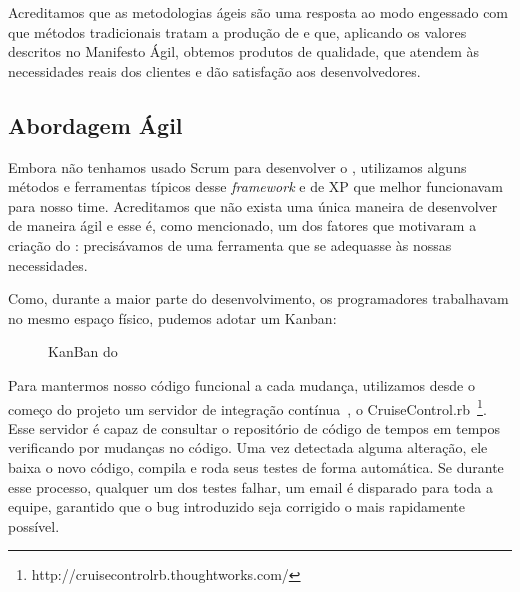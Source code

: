 Acreditamos que as metodologias ágeis são uma resposta ao modo engessado com que métodos tradicionais tratam a produção de \software e que, aplicando os valores descritos no Manifesto Ágil, obtemos produtos de qualidade, que atendem às necessidades reais dos clientes e dão satisfação aos desenvolvedores.  

\subsection{Abordagem Ágil}

Embora não tenhamos usado Scrum para desenvolver o \calopsita, utilizamos alguns métodos e ferramentas típicos desse \textit{framework} e de XP que melhor funcionavam para nosso time. Acreditamos que não exista uma única maneira de desenvolver \software de maneira ágil e esse é, como mencionado, um dos fatores que motivaram a criação do \calopsita: precisávamos de uma ferramenta que se adequasse às nossas necessidades. 

Como, durante a maior parte do desenvolvimento, os programadores trabalhavam no mesmo espaço físico, pudemos adotar um Kanban:

\begin{figure}[H]
  \centering
  \caption{KanBan do \calopsita}
\end{figure}

Para mantermos nosso código funcional a cada mudança, utilizamos desde o começo do projeto um servidor de integração contínua~\cite{ci}, o CruiseControl.rb~\footnote{http://cruisecontrolrb.thoughtworks.com/}. Esse servidor é capaz de consultar o repositório de código de tempos em tempos verificando por mudanças no código. Uma vez detectada alguma alteração, ele baixa o novo código, compila e roda seus testes de forma automática. Se durante esse processo, qualquer um dos testes falhar, um email é disparado para toda a equipe, garantido que o bug introduzido seja corrigido o mais rapidamente possível.

